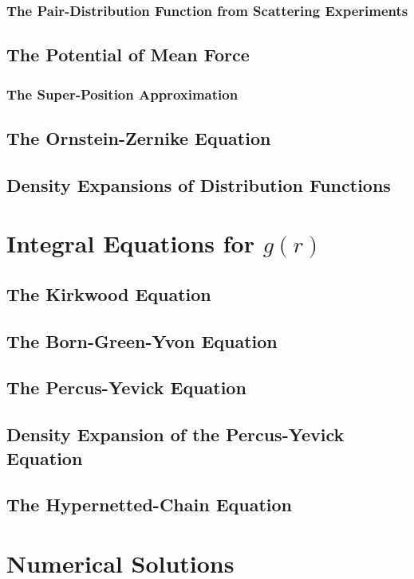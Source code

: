 \documentclass[a4paper,11pt]{article}
\begin{document}
\subsubsection{The Pair-Distribution Function from Scattering Experiments}
\subsection{The Potential of Mean Force}
\subsubsection{The Super-Position Approximation}
\subsection{The Ornstein-Zernike Equation}
\subsection{Density Expansions of Distribution Functions}

\section{Integral Equations for $g(r)$}\label{sec:integral}

\subsection{The Kirkwood Equation}\label{ssec:kirkwood}

\subsection{The Born-Green-Yvon Equation}\label{ssec:born}
\subsection{The Percus-Yevick Equation}
\subsection{Density Expansion of the Percus-Yevick Equation}
\subsection{The Hypernetted-Chain Equation}

\section{Numerical Solutions}
\end{document}
